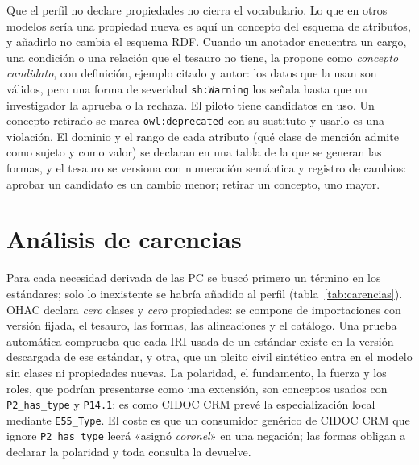 \documentclass[runningheads]{llncs}
\newcommand{\ttt}[1]{\texttt{\small #1}}
\begin{document}
Que el perfil no declare propiedades no cierra el vocabulario. Lo que en otros modelos sería una propiedad nueva es
aquí un concepto del esquema de atributos, y añadirlo no cambia el esquema RDF. Cuando un anotador encuentra un
cargo, una condición o una relación que el tesauro no tiene, la propone como \emph{concepto candidato}, con
definición, ejemplo citado y autor: los datos que la usan son válidos, pero una forma de severidad \ttt{sh:Warning}
los señala hasta que un investigador la aprueba o la rechaza. El piloto tiene \cifraCandidatos{} candidatos en uso.
Un concepto retirado se marca \ttt{owl:deprecated} con su sustituto y usarlo es una violación. El dominio y el rango
de cada atributo (qué clase de mención admite como sujeto y como valor) se declaran en una tabla de la que se generan
las formas, y el tesauro se versiona con numeración semántica y registro de cambios: aprobar un candidato es un cambio
menor; retirar un concepto, uno mayor.

\section{Análisis de carencias}\label{sec:carencias}

Para cada necesidad derivada de las PC se buscó primero un término en los estándares; solo lo inexistente se habría
añadido al perfil (tabla~\ref{tab:carencias}). OHAC declara \emph{cero} clases y \emph{cero} propiedades: se compone
de importaciones con versión fijada, el tesauro, las formas, las alineaciones y el catálogo. Una prueba automática
comprueba que cada IRI usada de un estándar existe en la versión descargada de ese estándar, y otra, que un pleito
civil sintético entra en el modelo sin clases ni propiedades nuevas. La polaridad, el fundamento, la fuerza y los
roles, que podrían presentarse como una extensión, son conceptos usados con \ttt{P2\_has\_type} y \ttt{P14.1}: es
como CIDOC CRM prevé la especialización local mediante \ttt{E55\_Type}. El coste es que un consumidor genérico de
CIDOC CRM que ignore \ttt{P2\_has\_type} leerá «asignó \emph{coronel}» en una negación; las formas obligan a declarar
la polaridad y toda consulta la devuelve.
\end{document}
